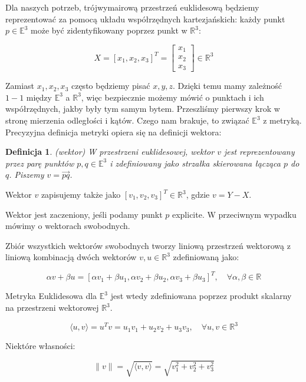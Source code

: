 \documentclass[a4paper,12pt]{article}
\newtheorem{defi}{Definicja}
\newcommand{\E}{\mathbb{E}}
\newcommand{\R}{\mathbb{R}}
\newcommand{\RR}{\mathbb{R}^3}
\newcommand{\vecs}[2]{\langle #1 , #2 \rangle}
\begin{document}
Dla naszych potrzeb, trójwymairową przestrzeń euklidesową będziemy reprezentować za pomocą układu współrzędnych kartezjańskich: każdy punkt $p \in \E^3$ może być zidentyfikowany poprzez punkt w $\R^3$:

\begin{equation}
X = [x_1, x_2, x_3]^T = 
\begin{bmatrix}
x_1 \\ x_2 \\ x_3
\end{bmatrix}
\in \RR
\end{equation}


Zamiast $x_1,x_2,x_3$ często będziemy pisać $x,y,z$. Dzięki temu mamy zależność $1-1$ między $\E^3$ a $\R^3$, więc bezpiecznie możemy mówić o punktach i ich współrzędnych, jakby były tym samym bytem. Przeszliśmy pierwszy krok w stronę mierzenia odległości i kątów. Czego nam brakuje, to związać $\E^3$ z metryką. Precyzyjna definicja metryki opiera się na definicji wektora:

\begin{defi}(wektor)
W przestrzeni euklidesowej, wektor $v$ jest reprezentowany przez parę punktów $p,q \in \E^3$ i zdefiniowany jako strzałka skierowana łącząca $p$ do $q$. Piszemy $v = \vec{pq}$.
\end{defi}

\noindent Wektor $v$ zapisujemy także jako $[v_1,v_2,v_3]^T \in \R^3$, gdzie $v = Y - X$.

Wektor jest zaczeniony, jeśli podamy punkt $p$ explicite. W przeciwnym wypadku mówimy o wektorach swobodnych.

Zbiór wszystkich wektorów swobodnych tworzy liniową przestrzeń wektorową z liniową kombinacją dwóch wektorów $v, u \in \R^3$ zdefiniowaną jako:

\begin{equation}
\alpha v + \beta u = [\alpha v_1 + \beta u_1, \alpha v_2 + \beta u_2, \alpha v_3 + \beta u_3]^T, \quad \forall \alpha,\beta \in \R
\end{equation}

Metryka Euklidesowa dla $\E^3$ jest wtedy zdefiniowana poprzez produkt skalarny na przestrzeni wektorowej $\R^3$.

\begin{equation}
\vecs{u}{v} = u^Tv = u_1v_1 + u_2v_2 + u_3v_3, \quad \forall u,v \in \R^3
\end{equation}

Niektóre własności:

\begin{equation}
\| v \| = \sqrt{\vecs{v}{v}} = \sqrt{v^2_1 + v^2_2 + v^2_3}
\end{equation}
\end{document}
